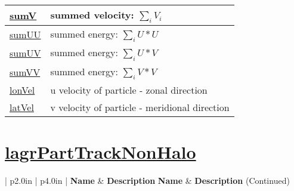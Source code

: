 {\begin{center}
\begin{longtable}{| p{2.0in} | p{4.0in} |}
    \hline
    \hyperref[subsec:var_sec_lagrPartTrackHalo_sumV]{sumV} &  summed velocity:  $\sum_i V_i$  \\
    \hline
    \hyperref[subsec:var_sec_lagrPartTrackHalo_sumUU]{sumUU} &  summed energy:  $\sum_i U*U$  \\
    \hline
    \hyperref[subsec:var_sec_lagrPartTrackHalo_sumUV]{sumUV} &  summed energy:  $\sum_i U*V$  \\
    \hline
    \hyperref[subsec:var_sec_lagrPartTrackHalo_sumVV]{sumVV} &  summed energy:  $\sum_i V*V$  \\
    \hline
    \hyperref[subsec:var_sec_lagrPartTrackHalo_lonVel]{lonVel} & u velocity of particle - zonal direction \\
    \hline
    \hyperref[subsec:var_sec_lagrPartTrackHalo_latVel]{latVel} & v velocity of particle - meridional direction \\
    \hline
\end{longtable}
\end{center}
}
\section[lagrPartTrackNonHalo]{\hyperref[sec:var_sec_lagrPartTrackNonHalo]{lagrPartTrackNonHalo}}
\label{sec:var_tab_lagrPartTrackNonHalo}
\vspace{0.5in}
{\small
\begin{center}
\begin{longtable}{| p{2.0in} | p{4.0in} |}
    \hline
    {\bf Name} & {\bf Description} \endfirsthead
    \hline 
    {\bf Name} & {\bf Description} (Continued) \endhead
    \hline
\end{longtable}
\end{center}
}

